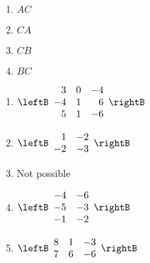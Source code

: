 \begin{enumialphparenastyle}
\begin{ex}
\begin{enumerate}
\item $AC$

\item $CA$

\item $CB$

\item $BC$
\end{enumerate}

\begin{sol}
\begin{enumerate}
\item $\leftB
\begin{array}{rrr}
3 & 0 & -4 \\
-4 & 1 & 6 \\
5 & 1 & -6
\end{array}
\rightB $
\item $\leftB
\begin{array}{rr}
1 & -2 \\
-2 & -3
\end{array}
\rightB $
\item Not possible
\item $\leftB
\begin{array}{rr}
-4 & -6 \\
-5 & -3 \\
-1 & -2
\end{array}
\rightB $
\item $\leftB
\begin{array}{rrr}
8 & 1 & -3 \\
7 & 6 & -6
\end{array}
\rightB $
\end{enumerate}
\end{sol}
\end{ex}


\end{enumialphparenastyle}
